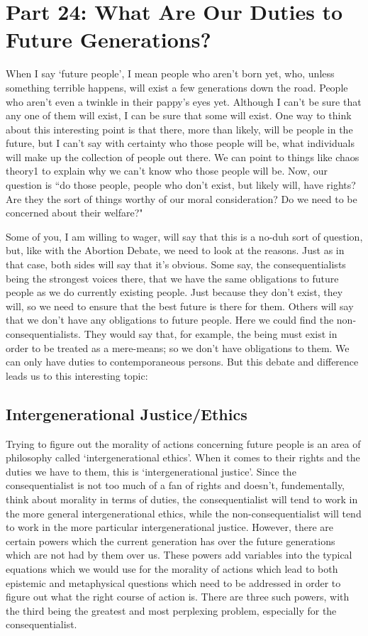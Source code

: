 \chapter{Part 24: What Are Our Duties to Future Generations?}
When I say ‘future people’, I mean people who aren’t born yet, who, unless something terrible happens, will exist a few generations down the road. People who aren’t even a twinkle in their pappy’s eyes yet. Although I can’t be sure that any one of them will exist, I can be sure that some will exist. One way to think about this interesting point is that there, more than  likely, will be people in the future, but I can't say with certainty who those people will be, what individuals will make up the collection of people out there. We can point to things like chaos theory1 to explain why we can't know who those people will be.  Now, our question is ``do those people, people who don't exist, but likely will, have rights? Are they the sort of things worthy of our moral consideration? Do we need to be concerned about their welfare?"

Some of you, I am willing to wager, will say that this is a no-duh sort of question, but, like with the Abortion Debate, we need to look at the reasons. Just as in that case, both sides will say that it's obvious. Some say, the consequentialists being the strongest voices there, that we have the same obligations to future people as we do currently existing people. Just because they don't exist, they will, so we need to ensure that the best future is there for them. Others will say that we don't have any obligations to future people. Here we could find the non-consequentialists. They would say that, for example, the being must exist in order to be treated as a mere-means; so we don't have obligations to them. We can only have duties to contemporaneous persons. But this debate and difference leads us to this interesting topic:
\section{Intergenerational Justice/Ethics}

Trying to figure out the morality of actions concerning future people is an area of philosophy called ‘intergenerational ethics’. When it comes to their rights and the duties we have to them, this is `intergenerational justice'. Since the consequentialist is not too much of a fan of rights and doesn't, fundementally, think about morality in terms of duties, the consequentialist will tend to work in the more general intergenerational ethics, while the non-consequentialist will tend to work in the more particular intergenerational justice. However, there are certain powers which the current generation has over the future generations which are not had by them over us. These powers add variables into the typical equations which we would use for the morality of actions which lead to both epistemic and metaphysical questions which need to be addressed in order to figure out what the right course of action is. There are three such powers, with the third being the greatest and most perplexing problem, especially for the consequentialist.
